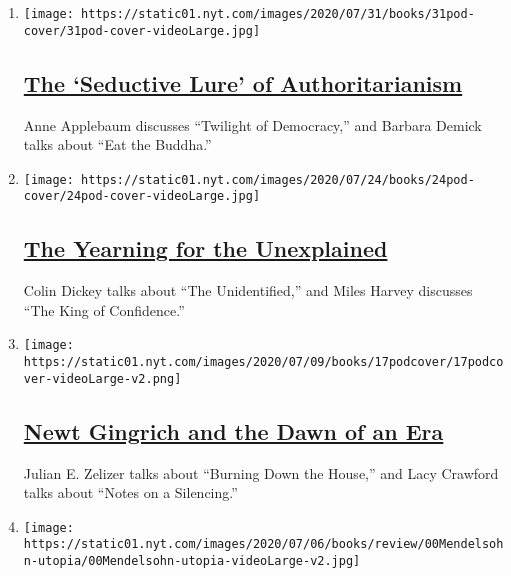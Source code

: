 \begin{enumerate}
\def\labelenumi{\arabic{enumi}.}
\item
  \texttt{[image: https://static01.nyt.com/images/2020/07/31/books/31pod-cover/31pod-cover-videoLarge.jpg]}

  \hypertarget{the-seductive-lure-of-authoritarianism}{%
  \subsection{\texorpdfstring{\href{/2020/07/31/books/review/podcast-twilight-democracy-anne-applebaum-eat-buddha-barbara-demick.html}{The
  `Seductive Lure' of
  Authoritarianism}}{The `Seductive Lure' of Authoritarianism}}\label{the-seductive-lure-of-authoritarianism}}

  Anne Applebaum discusses ``Twilight of Democracy,'' and Barbara Demick
  talks about ``Eat the Buddha.''
\item
  \texttt{[image: https://static01.nyt.com/images/2020/07/24/books/24pod-cover/24pod-cover-videoLarge.jpg]}

  \hypertarget{the-yearning-for-the-unexplained}{%
  \subsection{\texorpdfstring{\href{/2020/07/24/books/review/podcast-colin-dickey-unexplained-miles-harvey-king-of-confidence.html}{The
  Yearning for the
  Unexplained}}{The Yearning for the Unexplained}}\label{the-yearning-for-the-unexplained}}

  Colin Dickey talks about ``The Unidentified,'' and Miles Harvey
  discusses ``The King of Confidence.''
\item
  \texttt{[image: https://static01.nyt.com/images/2020/07/09/books/17podcover/17podcover-videoLarge-v2.png]}

  \hypertarget{newt-gingrich-and-the-dawn-of-an-era}{%
  \subsection{\texorpdfstring{\href{/2020/07/17/books/review/podcast-julian-zelizer-burning-down-house-newt-gingrich-notes-silencing-lacy-crawford.html}{Newt
  Gingrich and the Dawn of an
  Era}}{Newt Gingrich and the Dawn of an Era}}\label{newt-gingrich-and-the-dawn-of-an-era}}

  Julian E. Zelizer talks about ``Burning Down the House,'' and Lacy
  Crawford talks about ``Notes on a Silencing.''
\item
  \texttt{[image: https://static01.nyt.com/images/2020/07/06/books/review/00Mendelsohn-utopia/00Mendelsohn-utopia-videoLarge-v2.jpg]}


\end{enumerate}
